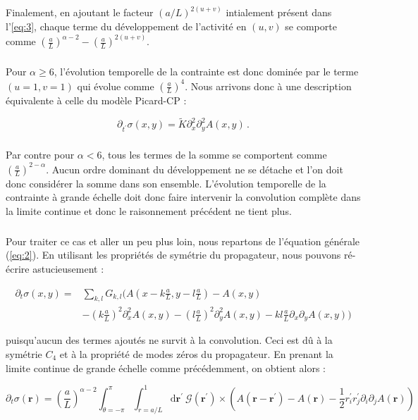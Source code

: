 \noindent Finalement, en ajoutant le facteur $(a/L)^{2(u+v)}$ intialement présent dans l'\autoref{eq:3}, chaque terme du développement de l'activité en $(u,v)$ se comporte comme $\left(\frac{a}{L}\right)^{\alpha-2}-\left( \frac{a}{L} \right)^{2(u+v)}$.

\subparagraph{}Pour $\alpha \geq 6$, l'évolution temporelle de la contrainte est donc dominée par le terme $(u=1,v=1)$ qui évolue comme $\left( \frac{a}{L} \right)^4$. Nous arrivons donc à une description équivalente à celle du modèle Picard-CP :

\begin{equation}
    \partial_{t^\prime}\sigma (x,y) = \tilde{K}\partial_x^{2}\partial_y^{2}A(x, y)\, .
    \label{eq:evol:sigma:Classa6}
\end{equation}

\subparagraph{}Par contre pour $\alpha < 6$, tous les termes de la somme se comportent comme $\left( \frac{a}{L} \right)^{2-\alpha}$. Aucun ordre dominant du développement ne se détache et l'on doit donc considérer la somme dans son ensemble. L'évolution temporelle de la contrainte à grande échelle doit donc faire intervenir la convolution complète dans la limite continue et donc le raisonnement précédent ne tient plus.

\subparagraph{}Pour traiter ce cas et aller un peu plus loin, nous repartons de l'équation générale (\autoref{eq:2}). En utilisant les propriétés de symétrie du propagateur, nous pouvons ré-écrire astucieusement :

\begin{equation}
\begin{aligned}
    \partial_t\sigma (x,y) =& \sum_{k,l}G_ {k,l}\Big(A(x-k\frac{a}{L}, y-l\frac{a}{L})-A(x,y)\\
    &-\left(k\frac{a}{L}\right)^2\partial_x^2A(x,y)-\left(l\frac{a}{L}\right)^2\partial_y^2A(x,y)
    -kl\frac{a}{L}\partial_x\partial_yA(x,y)\Big)
\end{aligned}
\end{equation}

\noindent puisqu'aucun des termes ajoutés ne survit à la convolution. Ceci est dû à la symétrie $C_4$ et à la propriété de modes zéros du propagateur. En prenant la limite continue de grande échelle comme précédemment, on obtient alors :

\begin{equation}
   \partial_t \sigma(\mathbf{r}) = \left( \frac{a}{L} \right)^{\alpha - 2}\int_{\theta=-\pi}^\pi\int_{r=a/L}^{1} \mathrm{d}\mathbf{r}^\prime ~ \mathcal{G}(\mathbf{r}^\prime)
     \times\left( A(\mathbf{r}-\mathbf{r}^\prime)-A(\mathbf{r})-\frac{1}{2}r_i^\prime r_j^\prime \partial_i\partial_jA(\mathbf{r}) \right)
    \label{eq:evol:sigma:LR:raw}
\end{equation}

